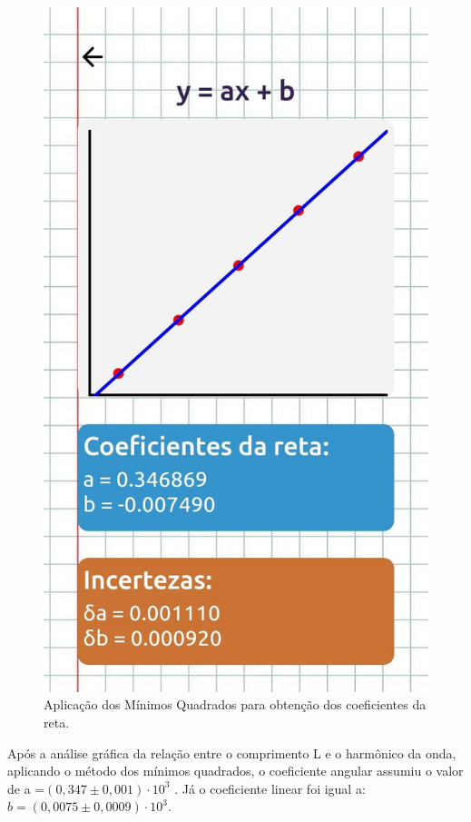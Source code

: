 \begin{figure}[H]
  \centering
  \includegraphics[scale=0.25]{images/Gráfico 2'.jpeg}
  \caption{ Aplicação dos Mínimos Quadrados para obtenção dos coeficientes da reta.}
\end{figure}

Após a análise gráfica da relação entre o comprimento L e o harmônico da onda, aplicando o método dos mínimos quadrados, o coeficiente angular assumiu o valor de a =$(0,347 \pm 0,001)\cdot 10^3$ . Já o coeficiente linear foi igual a: $b =(0,0075 \pm 0,0009)\cdot 10^3$.\\

